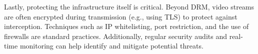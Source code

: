 Lastly, protecting the infrastructure itself is critical. Beyond DRM, video streams are often encrypted during transmission (e.g., using \ac{TLS}) to protect against interception. Techniques such as IP whitelisting, port restriction, and the use of firewalls are standard practices. Additionally, regular security audits and real-time monitoring can help identify and mitigate potential threats.





